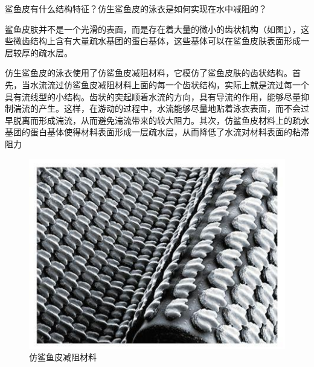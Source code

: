 \documentclass{assignment}
\begin{document}
\begin{ti}
    鲨鱼皮有什么结构特征？仿生鲨鱼皮的泳衣是如何实现在水中减阻的？
\end{ti}
\begin{da}
    鲨鱼皮肤并不是一个光滑的表面，而是存在着大量的微小的齿状机构（如图\ref{Shark-skin}），这些微齿结构上含有大量疏水基团的蛋白基体，这些基体可以在鲨鱼皮肤表面形成一层较厚的疏水层。

    仿生鲨鱼皮的泳衣使用了仿鲨鱼皮减阻材料，它模仿了鲨鱼皮肤的齿状结构。首先，当水流流过仿鲨鱼皮减阻材料上面的每一个齿状结构，实际上就是流过每一个具有流线型的小结构。齿状的突起顺着水流的方向，具有导流的作用，能够尽量抑制湍流的产生。这样，在游动的过程中，水流能够尽量地贴着泳衣表面，而不会过早脱离而形成湍流，从而避免湍流带来的较大阻力。其次，仿鲨鱼皮材料上的疏水基团的蛋白基体使得材料表面形成一层疏水层，从而降低了水流对材料表面的粘滞阻力
    \begin{figure}[H]
        \centering
        \includegraphics[width=.45\columnwidth]{Shark-skin.jpg}
        \caption{仿鲨鱼皮减阻材料}
        \label{Shark-skin}
    \end{figure}
\end{da}



\end{document}

